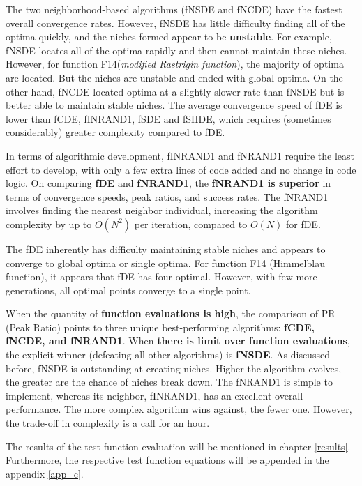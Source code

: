 The two neighborhood-based
algorithms (fNSDE and fNCDE) have the fastest overall convergence rates. However, fNSDE
has little difficulty finding all of the optima quickly, and the niches formed appear to be \textbf{unstable}. For example, fNSDE locates all of the optima rapidly and then cannot maintain these niches. However, for function F14(\textit{modified Rastrigin function}), the majority of optima are located. But the niches are unstable and ended with global optima. On the other hand, fNCDE located optima at a slightly slower rate than fNSDE but is better able to maintain stable niches. The average convergence speed of fDE is lower than fCDE, fINRAND1, fSDE and fSHDE, which requires (sometimes considerably) greater complexity compared to fDE.

In terms of algorithmic development, fINRAND1 and fNRAND1 require the least effort to develop, with only a few extra lines of code added and no change in code logic. On comparing \textbf{fDE} and \textbf{fNRAND1}, the \textbf{fNRAND1 is superior} in terms of convergence speeds, peak ratios, and success rates. The fNRAND1 involves finding the nearest neighbor individual, increasing the algorithm complexity by up to $O(N^2)$ per iteration, compared to $O(N)$ for fDE.

The fDE inherently has difficulty maintaining stable niches and appears to converge to global optima or single optima. For function F14 (Himmelblau function), it appears that fDE has four optimal. However, with few more generations, all optimal points converge to a single point.

When the quantity of \textbf{function evaluations is high}, the comparison of PR (Peak Ratio) points to three unique best-performing algorithms\cite{Poole3}: \textbf{fCDE, fNCDE, and fNRAND1}. When \textbf{ there is limit over function evaluations}, the explicit winner (defeating all other algorithms) is \textbf{fNSDE}. As discussed before, fNSDE is outstanding at creating niches. Higher the algorithm evolves, the greater are the chance of niches break down. The fNRAND1 is simple to implement, whereas its neighbor, fINRAND1, has an excellent overall performance. The more complex algorithm wins against, the fewer one. However, the trade-off in complexity is a call for an hour.

The results of the test function evaluation will be mentioned in chapter \ref{results}. Furthermore, the respective test function equations will be appended in the appendix \ref{app_c}.